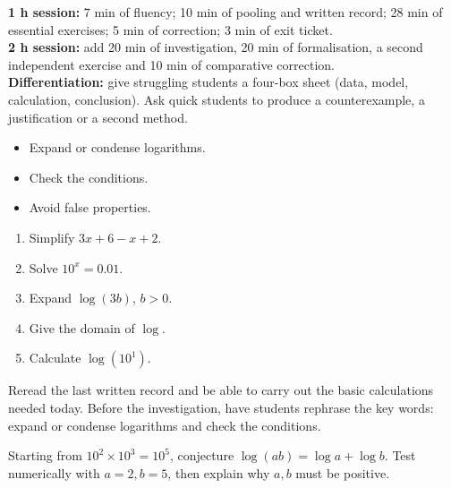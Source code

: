 \ifprof
\begin{methode}
\textbf{1 h session:} 7 min of fluency; 10 min of pooling and written record; 28 min of essential exercises; 5 min of correction; 3 min of exit ticket.\\
\textbf{2 h session:} add 20 min of investigation, 20 min of formalisation, a second independent exercise and 10 min of comparative correction.\\
\textbf{Differentiation:} give struggling students a four-box sheet (data, model, calculation, conclusion). Ask quick students to produce a counterexample, a justification or a second method.
\end{methode}
\fi
{}
\begin{objectifs}\begin{itemize}\item Expand or condense logarithms.\item Check the conditions.\item Avoid false properties.\end{itemize}\end{objectifs}
\begin{automatismes}\begin{enumerate}\item Simplify $3x+6-x+2$. \item Solve $10^x=0.01$. \item Expand $\log(3b)$, $b>0$. \item Give the domain of $\log$. \rep{$]0,+\infty[$}\item Calculate $\log(10^1)$. \end{enumerate}\end{automatismes}
\begin{prerequis}Reread the last written record and be able to carry out the basic calculations needed today. Before the investigation, have students rephrase the key words: expand or condense logarithms and check the conditions.\end{prerequis}

\begin{activite}
Starting from $10^2\times10^3=10^5$, conjecture $\log(ab)=\log a+\log b$. Test numerically with $a=2,b=5$, then explain why $a,b$ must be positive.

\end{activite}

